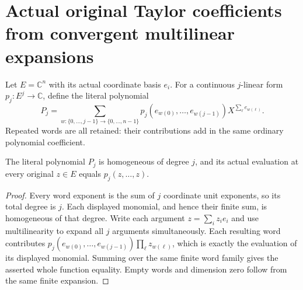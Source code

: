 \section{Actual original Taylor coefficients from convergent multilinear expansions}
\label{sec:hironaka-actual-multilinear-taylor-coordinates}
Let $E=\mathbb C^n$ with its actual coordinate basis $e_i$. For a continuous $j$-linear form $p_j:E^j\to\mathbb C$, define the literal polynomial
\[
 P_j=\sum_{w:\{0,\dots,j-1\}\to\{0,\dots,n-1\}}
 p_j(e_{w(0)},\dots,e_{w(j-1)})X^{\sum_\ell e_{w(\ell)}}.
\]
Repeated words are all retained: their contributions add in the same ordinary polynomial coefficient.

\begin{theorem}
\label{hir:actual-multilinear-coordinate-polynomial}
\leanok
The literal polynomial $P_j$ is homogeneous of degree $j$, and its actual evaluation at every original $z\in E$ equals $p_j(z,\dots,z)$.
\end{theorem}
\begin{proof}
Every word exponent is the sum of $j$ coordinate unit exponents, so its total degree is $j$. Each displayed monomial, and hence their finite sum, is homogeneous of that degree. Write each argument $z=\sum_i z_i e_i$ and use multilinearity to expand all $j$ arguments simultaneously. Each resulting word contributes $p_j(e_{w(0)},\dots,e_{w(j-1)})\prod_\ell z_{w(\ell)}$, which is exactly the evaluation of its displayed monomial. Summing over the same finite word family gives the asserted whole function equality. Empty words and dimension zero follow from the same finite expansion.
\end{proof}

